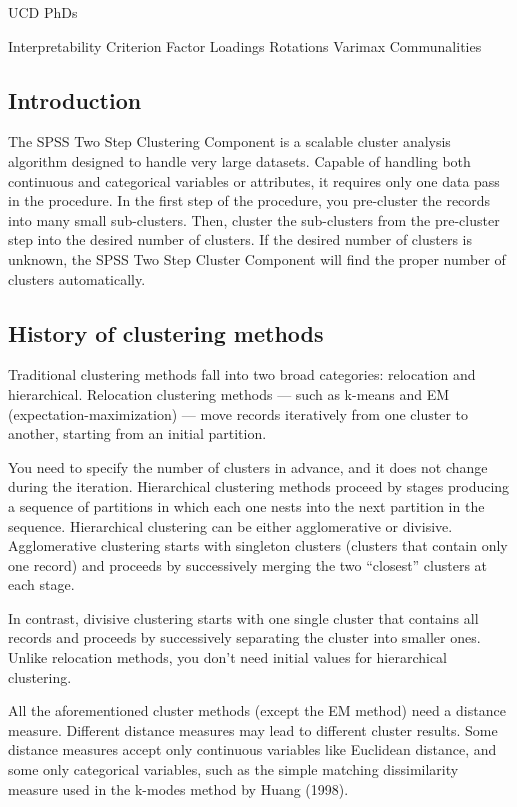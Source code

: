 
UCD PhDs

Interpretability Criterion
Factor Loadings
Rotations
Varimax
Communalities




\subsection{Introduction}

The SPSS Two Step Clustering Component is a scalable cluster analysis algorithm designed
to handle very large datasets. Capable of handling both continuous and categorical variables
or attributes, it requires only one data pass in the procedure. In the first step of the
procedure, you pre-cluster the records into many small sub-clusters. Then, cluster the
sub-clusters from the pre-cluster step into the desired number of clusters. If the desired
number of clusters is unknown, the SPSS Two Step Cluster Component will find the proper
number of clusters automatically.


\subsection{History of clustering methods}
Traditional clustering methods fall into two broad categories: relocation and hierarchical.
Relocation clustering methods — such as k-means and EM (expectation-maximization) —
move records iteratively from one cluster to another, starting from an initial partition.

You need to specify the number of clusters in advance, and it does not change during the iteration. Hierarchical clustering methods proceed by stages producing a sequence of
partitions in which each one nests into the next partition in the sequence. Hierarchical clustering can be either agglomerative or divisive. Agglomerative clustering starts with
singleton clusters (clusters that contain only one record) and proceeds by successively merging the two “closest” clusters at each stage. 

In contrast, divisive clustering starts with one single cluster that contains all records and proceeds by successively separating the
cluster into smaller ones. Unlike relocation methods, you don’t need initial values for hierarchical clustering.

All the aforementioned cluster methods (except the EM method) need a distance measure. Different distance measures may lead to different cluster results. Some distance
measures accept only continuous variables like Euclidean distance, and some only categorical
variables, such as the simple matching dissimilarity measure used in the k-modes
method by Huang (1998).

